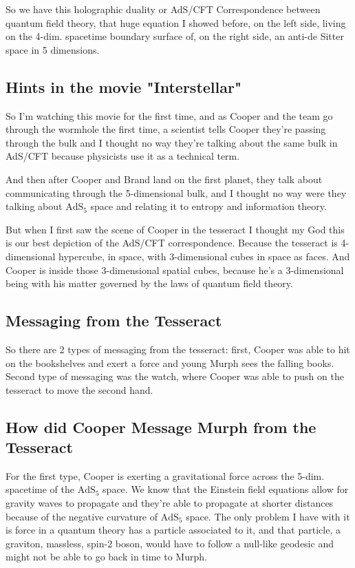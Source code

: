 \documentclass[10pt]{amsart}
\begin{document}
So we have this holographic duality or AdS/CFT Correspondence between quantum field theory, that huge equation I showed before, on the left side, living on the 4-dim. spacetime boundary surface of, on the right side, an anti-de Sitter space in 5 dimensions.

\subsection{Hints in the movie "Interstellar"}

So I'm watching this movie for the first time, and as Cooper and the team go through the wormhole the first time, a scientist tells Cooper they're passing through the bulk and I thought no way they're talking about the same bulk in AdS/CFT because physicists use it as a technical term.

And then after Cooper and Brand land on the first planet, they talk about communicating through the 5-dimensional bulk, and I thought no way were they talking about $\text{AdS}_5$ space and relating it to entropy and information theory.

But when I first saw the scene of Cooper in the tesseract I thought my God this is our best depiction of the AdS/CFT correspondence. Because the tesseract is 4-dimensional hypercube, in space, with 3-dimensional cubes in space as faces. And Cooper is inside those 3-dimensional spatial cubes, because he's a 3-dimensional being with his matter governed by the laws of quantum field theory. 

\subsection{Messaging from the Tesseract}

So there are 2 types of messaging from the tesseract: first, Cooper was able to hit on the bookshelves and exert a force and young Murph sees the falling books. Second type of messaging was the watch, where Cooper was able to push on the tesseract to move the second hand.

\subsection{How did Cooper Message Murph from the Tesseract}

For the first type, Cooper is exerting a gravitational force across the 5-dim. spacetime of the $\text{AdS}_5$ space. We know that the Einstein field equations allow for gravity waves to propagate and they're able to propagate at shorter distances because of the negative curvature of $\text{AdS}_5$ space. The only problem I have with it is force in a quantum theory has a particle associated to it, and that particle, a graviton, massless, spin-2 boson, would have to follow a null-like geodesic and might not be able to go back in time to Murph.
\end{document}
